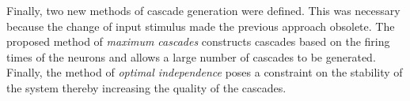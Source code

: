 Finally, two new methods of cascade generation were defined. This was necessary because the change of input stimulus made the previous approach obsolete. The proposed method of \textit{maximum cascades} constructs cascades based on the firing times of the neurons and allows a large number of cascades to be generated. Finally, the method of \textit{optimal independence} poses a constraint on the stability of the system thereby increasing the quality of the cascades.




